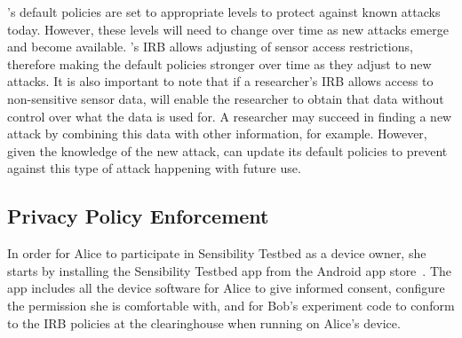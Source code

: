 \sysname's default policies are set to appropriate levels to protect against 
known attacks today. %
However, these levels will need to change over time as
new attacks emerge and become available. \sysname's IRB allows adjusting 
of sensor access restrictions, therefore making the default policies
stronger over time as they adjust to new attacks. It is also important to note that 
if a researcher's IRB allows access to non-sensitive sensor data, \sysname will 
enable the researcher to obtain that data without control over what the data is used for.
A researcher may succeed in finding a new attack by combining this data with other 
information, for example. However, given the 
knowledge of the new attack, \sysname can update its default policies to prevent against
this type of attack happening with future use. 
%
%
%


\subsection{Privacy Policy Enforcement}\label{sec-repy}

In order for Alice to participate in Sensibility Testbed as a device owner,
she starts by installing the Sensibility Testbed app from 
the Android app store~\cite{sensibility-app}. The app includes all the device
software for Alice to give informed consent, configure the permission she
is comfortable with, and for Bob's experiment code to conform to the 
IRB policies at the clearinghouse when running on Alice's device.

